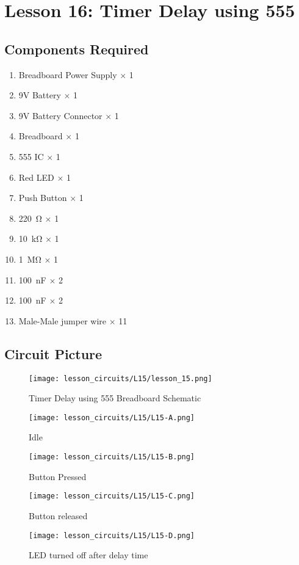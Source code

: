 \section{Lesson 16: Timer Delay using 555}
\subsection{Components Required}
\begin{enumerate}
    \item Breadboard Power Supply $\times$ 1
    \item 9V Battery $\times$ 1
    \item 9V Battery Connector $\times$ 1
    \item Breadboard $\times$ 1
    \item 555 IC $\times$ 1
    \item Red LED $\times$ 1
    \item Push Button $\times$ 1
    \item \SI{220}{\ohm} $\times$ 1
    \item \SI{10}{\kilo\ohm} $\times$ 1
    \item \SI{1}{\Mohm} $\times$ 1
    \item \SI{100}{\nano\farad} $\times$ 2
    \item \SI{100}{\nano\farad} $\times$ 2
    \item Male-Male jumper wire $\times$ 11
\end{enumerate}
\subsection{Circuit Picture}
\begin{figure}[!h]
    \centering
    \texttt{[image: lesson\_circuits/L15/lesson\_15.png]}
    \caption{Timer Delay using 555 Breadboard Schematic}
    \label{fig:555_timer_sch}
\end{figure}
\begin{figure}[!h]
    \centering
    \texttt{[image: lesson\_circuits/L15/L15-A.png]}
    \caption{Idle}
    \label{fig:555_timer_obb}
\end{figure}
\begin{figure}[!h]
    \centering
    \texttt{[image: lesson\_circuits/L15/L15-B.png]}
    \caption{Button Pressed}
    \label{fig:555_timer_obb1}
\end{figure}
\begin{figure}[!h]
    \centering
    \texttt{[image: lesson\_circuits/L15/L15-C.png]}
    \caption{Button released}
    \label{fig:555_timer_obb2}
\end{figure}
\begin{figure}[!h]
    \centering
    \texttt{[image: lesson\_circuits/L15/L15-D.png]}
    \caption{LED turned off after delay time}
    \label{fig:555_timer_obb3}
\end{figure}
